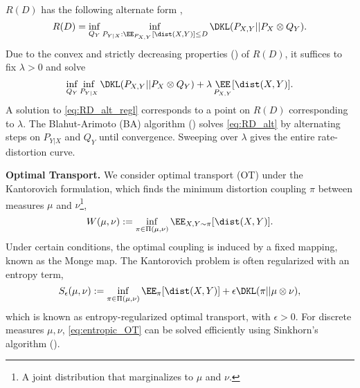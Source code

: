 \documentclass{article} %
\begin{document}
    $R(D)$ has the following alternate form \cite[Ch.~10]{CoverThomas},
    \begin{equation}
    R(D) = \inf_{Q_Y} \inf_{\substack{P_{Y|X}:  \EE_{P_{X,Y}}[\dist(X,Y)]  \leq D}} \DKL(P_{X,Y}||P_X \otimes Q_Y).
    \label{eq:RD_alt}
    \end{equation}
    Due to the convex and strictly decreasing properties (\cite{CoverThomas}) of $R(D)$, it suffices to fix $\lambda > 0$ and solve
    \begin{equation}
        \inf_{Q_Y} \inf_{P_{Y|X}}\DKL(P_{X,Y}|| P_X \otimes Q_Y) + \lambda \mathop{\EE}_{P_{X,Y}}[\dist(X,Y)].
        \label{eq:RD_alt_regl}
    \end{equation}
    A solution to \eqref{eq:RD_alt_regl} corresponds to a point on $R(D)$ corresponding to $\lambda$. The Blahut-Arimoto (BA) algorithm (\cite{blahut, arimoto}) solves \eqref{eq:RD_alt} by alternating steps on $P_{Y|X}$ and $Q_Y$ until convergence. Sweeping over $\lambda$ gives the entire rate-distortion curve.
    

    \textbf{Optimal Transport.} We consider optimal transport (OT) under the Kantorovich formulation, which finds the minimum distortion coupling $\pi$ between measures $\mu$ and $\nu$\footnote{A joint distribution that marginalizes to $\mu$ and $\nu$.},
    \begin{equation}
        W(\mu, \nu) := \inf_{\substack{\pi \in \Pi(\mu, \nu)}} \EE_{X,Y\sim \pi}[\dist(X,Y)].
    \end{equation}
    Under certain conditions, the optimal coupling is induced by a fixed mapping, known as the Monge map. The Kantorovich problem is often regularized with an entropy term, 
    \begin{equation}
        S_\epsilon(\mu, \nu) := \inf_{\substack{\pi \in \Pi(\mu, \nu)}} \EE_{\pi}[\dist(X,Y)] + \epsilon \DKL(\pi||\mu \otimes \nu),
        \label{eq:entropic_OT}
    \end{equation}
    which is known as entropy-regularized optimal transport, with $\epsilon > 0$. For discrete measures $\mu,\nu$, \eqref{eq:entropic_OT} can be solved efficiently using Sinkhorn's algorithm (\cite{knopp_sinkhorn, sinkhorn}).
\end{document}
